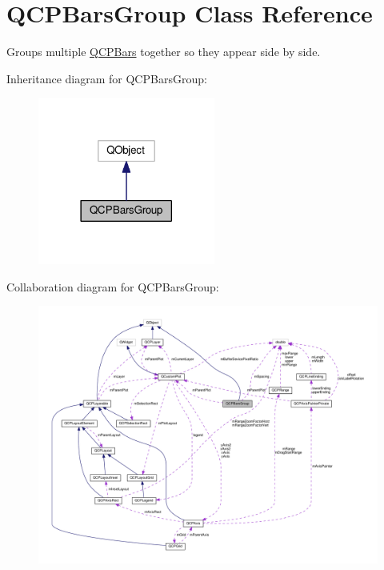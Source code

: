 \hypertarget{classQCPBarsGroup}{}\section{Q\+C\+P\+Bars\+Group Class Reference}
\label{classQCPBarsGroup}


Groups multiple \hyperlink{classQCPBars}{Q\+C\+P\+Bars} together so they appear side by side.  




Inheritance diagram for Q\+C\+P\+Bars\+Group\+:
\nopagebreak
\begin{figure}[H]
\begin{center}
\leavevmode
\includegraphics[width=165pt]{classQCPBarsGroup__inherit__graph}
\end{center}
\end{figure}


Collaboration diagram for Q\+C\+P\+Bars\+Group\+:
\nopagebreak
\begin{figure}[H]
\begin{center}
\leavevmode
\includegraphics[width=350pt]{classQCPBarsGroup__coll__graph}
\end{center}
\end{figure}
